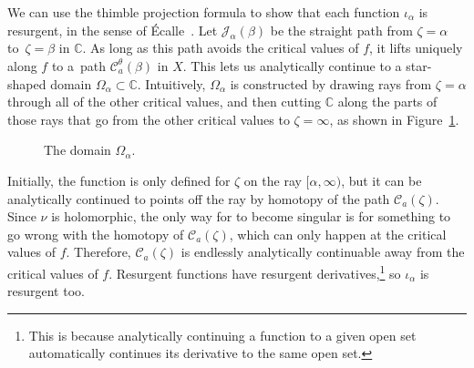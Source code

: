 \documentclass[10pt,a4paper]{amsart}
\newcommand{\C}{\mathbb{C}}
\numberwithin{equation}{section}
\begin{document}
\begin{Remark}
We can use the thimble projection formula to show that each function $\iota_\alpha$ is resurgent, in the sense of \'{E}calle~\cite[Section~1]{EcalleI}. Let $\mathcal{J}_\alpha(\beta)$ be the straight path from $\zeta = \alpha$ to~${\zeta = \beta}$ in $\C$. As long as this path avoids the critical values of $f$, it lifts uniquely along $f$ to a~path $\mathcal{C}_a^\theta(\beta)$ in $X$. This lets us analytically continue  to a star-shaped domain $\Omega_\alpha \subset \C$. Intuitively, $\Omega_\alpha$ is constructed by drawing rays from $\zeta = \alpha$ through all of the other critical values, and then cutting $\C$ along the parts of those rays that go from the other critical values to $\zeta = \infty$, as shown in Figure~\ref{Fig:slit domain}.
\begin{figure}[!ht]\centering\vspace{-2mm}


\vspace{-1mm}

\caption{The domain $\Omega_\alpha$.}\label{Fig:slit domain}
\end{figure}

Initially, the function  is only defined for $\zeta$ on the ray $[\alpha, \infty)$, but it can be analytically continued to points off the ray by homotopy of the path $\mathcal{C}_a(\zeta)$. Since $\nu$ is holomorphic, the only way for  to become singular is for something to go wrong with the homotopy of $\mathcal{C}_a(\zeta)$, which can only happen at the critical values of $f$. Therefore, $\mathcal{C}_a(\zeta)$ is endlessly analytically continuable away from the critical values of $f$. Resurgent functions have resurgent derivatives,\footnote{This is because analytically continuing a function to a given open set automatically continues its derivative to the same open set.} so $\iota_\alpha$ is resurgent too.
\end{Remark}
\end{document}
